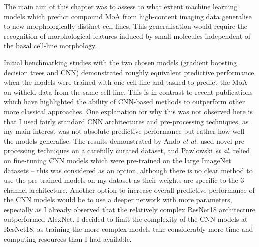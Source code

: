 \documentclass[a4paper,11pt,twoside,openright]{scrbook}
\begin{document}
The main aim of this chapter was to assess to what extent machine learning models which predict compound MoA from 
high-content imaging data generalise to new morphologically distinct cell-lines.
This generalisation would require the recognition of morphological features induced by small-molecules independent of 
the basal cell-line morphology.

Initial benchmarking studies with the two chosen models (gradient boosting decision trees and CNN) demonstrated roughly 
equivalent predictive performance when the models were trained with one cell-line and tasked to predict the MoA on 
witheld data from the same cell-line.
This is in contrast to recent publications which have highlighted the ability of CNN-based methods to outperform other 
more classical approaches. \cite{Ando2017, Pawlowski2016}
One explanation for why this was not observed here is that I used fairly standard CNN architectures and pre-processing 
techniques, as my main interest was not absolute predictive performance but rather how well the models generalise.
The results demonstrated by Ando \textit{et al.} used novel pre-processing techniques on a carefully curated dataset, 
and Pawlowski \textit{et al.} relied on fine-tuning CNN models which were pre-trained on the large ImageNet datasets -- 
this was considered as an option, although there is no clear method to use the pre-trained models on my dataset as 
their weights are specific to the 3 channel architecture.
Another option to increase overall predictive performance of the CNN models would be to use a deeper network with more 
parameters, especially as I already observed that the relatively complex ResNet18 architecture outperformed AlexNet.
I decided to limit the complexity of the CNN models at ResNet18, as training the more complex models take considerably 
more time and computing resources than I had available.
\end{document}
